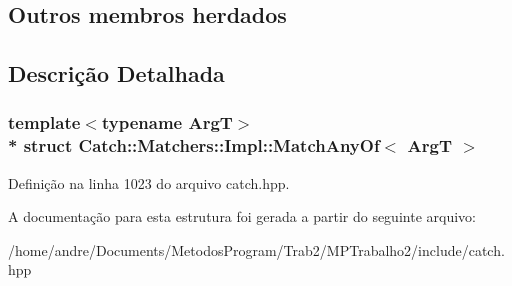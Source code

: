 \subsection*{Outros membros herdados}


\subsection{Descrição Detalhada}
\subsubsection*{template$<$typename ArgT$>$\\*
struct Catch\+::\+Matchers\+::\+Impl\+::\+Match\+Any\+Of$<$ Arg\+T $>$}



Definição na linha 1023 do arquivo catch.\+hpp.



A documentação para esta estrutura foi gerada a partir do seguinte arquivo\+:\begin{DoxyCompactItemize}
\item 
/home/andre/\+Documents/\+Metodos\+Program/\+Trab2/\+M\+P\+Trabalho2/include/catch.\+hpp\end{DoxyCompactItemize}
